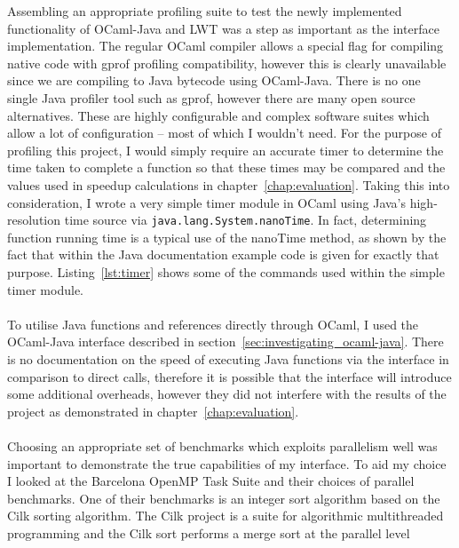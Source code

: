 \documentclass[12pt,twoside,notitlepage]{report}
\begin{document}
Assembling an appropriate profiling suite to test the newly implemented functionality of OCaml-Java and LWT was a step as important as the interface implementation. The regular OCaml compiler allows a special flag for compiling native code with gprof
profiling compatibility\cite{leroy2013}, however this is clearly unavailable since we are compiling to Java bytecode using OCaml-Java. There is no one single Java profiler tool such as gprof, however there are many open source
alternatives. These are highly configurable and complex software suites which allow a lot of configuration -- most of which I wouldn't need. For the purpose of profiling this project, I would simply require an accurate timer to
determine the time taken to complete a function so that these times may be compared and the values used in speedup calculations in chapter~\ref{chap:evaluation}. Taking this into consideration, I wrote a very simple timer module in
OCaml using Java's high-resolution time source via {\tt java.lang.System.nanoTime}. In fact, determining function running time is a typical use of the nanoTime method, as shown by the fact that within the Java documentation example
code is given for exactly that purpose. Listing~\ref{lst:timer} shows some of the commands used within the simple timer module.
\hfill\\

\hfill\\
To utilise Java functions and references directly through OCaml, I used the OCaml-Java interface described in section~\ref{sec:investigating_ocaml-java}. There is no documentation on the speed of executing Java functions via the interface in
comparison to direct calls, therefore it is possible that the interface will introduce some additional overheads, however they did not interfere with the results of the project as demonstrated in chapter~\ref{chap:evaluation}.
\hfill\\
\hfill\\
%
%
Choosing an appropriate set of benchmarks which exploits parallelism well was important to demonstrate the true capabilities of my interface. To aid my choice I looked at the Barcelona OpenMP Task Suite and their choices of parallel
benchmarks. One of their benchmarks is an integer sort algorithm based on the Cilk sorting algorithm. The Cilk project is a suite for algorithmic multithreaded programming and the Cilk sort performs a merge sort at the parallel level
\end{document}
